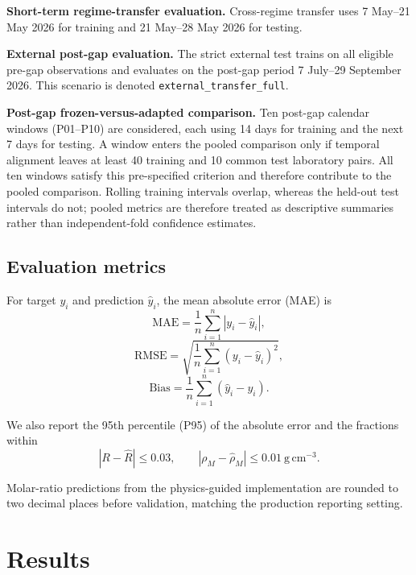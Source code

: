 \documentclass[preprint,12pt,authoryear]{elsarticle}
\begin{document}
\textbf{Short-term regime-transfer evaluation.} Cross-regime transfer uses 7 May--21 May 2026 for training and 21 May--28 May 2026 for testing.

\textbf{External post-gap evaluation.} The strict external test trains on all eligible pre-gap observations and evaluates on the post-gap period 7 July--29 September 2026. This scenario is denoted \texttt{external\_transfer\_full}.

\textbf{Post-gap frozen-versus-adapted comparison.} Ten post-gap calendar windows (P01--P10) are considered, each using 14 days for training and the next 7 days for testing. A window enters the pooled comparison only if temporal alignment leaves at least 40 training and 10 common test laboratory pairs. All ten windows satisfy this pre-specified criterion and therefore contribute to the pooled comparison. Rolling training intervals overlap, whereas the held-out test intervals do not; pooled metrics are therefore treated as descriptive summaries rather than independent-fold confidence estimates.

\subsection{Evaluation metrics}

For target $y_i$ and prediction $\hat y_i$, the mean absolute error (MAE) is
\begin{equation}
\mathrm{MAE}=\frac{1}{n}\sum_{i=1}^{n}|y_i-\hat y_i|,
\end{equation}
\begin{equation}
\mathrm{RMSE}=
\sqrt{\frac{1}{n}\sum_{i=1}^{n}(y_i-\hat y_i)^2},
\end{equation}
\begin{equation}
\mathrm{Bias}=
\frac{1}{n}\sum_{i=1}^{n}(\hat y_i-y_i).
\end{equation}

We also report the 95th percentile (P95) of the absolute error and the fractions within
\begin{equation}
|R-\widehat R|\le0.03,
\qquad
|\rho_M-\widehat{\rho}_M|\le0.01\ \mathrm{g\,cm^{-3}}.
\end{equation}

Molar-ratio predictions from the physics-guided implementation are rounded to two decimal places before validation, matching the production reporting setting.

\section{Results}
\end{document}
